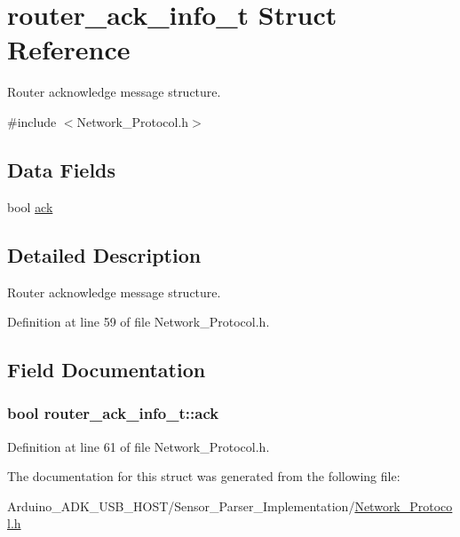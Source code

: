 \hypertarget{structrouter__ack__info__t}{\section{router\-\_\-ack\-\_\-info\-\_\-t Struct Reference}
\label{structrouter__ack__info__t}
}


Router acknowledge message structure.  




{\ttfamily \#include $<$Network\-\_\-\-Protocol.\-h$>$}

\subsection*{Data Fields}
\begin{DoxyCompactItemize}
\item 
bool \hyperlink{structrouter__ack__info__t_a512e5fe3429126c86cf448cb0d0c1cdf}{ack}
\end{DoxyCompactItemize}


\subsection{Detailed Description}
Router acknowledge message structure. 

Definition at line 59 of file Network\-\_\-\-Protocol.\-h.



\subsection{Field Documentation}
\hypertarget{structrouter__ack__info__t_a512e5fe3429126c86cf448cb0d0c1cdf}{
\subsubsection[{ack}]{\setlength{\rightskip}{0pt plus 5cm}bool router\-\_\-ack\-\_\-info\-\_\-t\-::ack}}\label{structrouter__ack__info__t_a512e5fe3429126c86cf448cb0d0c1cdf}


Definition at line 61 of file Network\-\_\-\-Protocol.\-h.



The documentation for this struct was generated from the following file\-:\begin{DoxyCompactItemize}
\item 
Arduino\-\_\-\-A\-D\-K\-\_\-\-U\-S\-B\-\_\-\-H\-O\-S\-T/\-Sensor\-\_\-\-Parser\-\_\-\-Implementation/\hyperlink{_network___protocol_8h}{Network\-\_\-\-Protocol.\-h}\end{DoxyCompactItemize}
